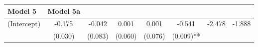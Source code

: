 \documentclass[12pt,twoside]{reedthesis}
\begin{document}
\begin{longtable}[]{@{}lccccccc@{}}
\begin{minipage}[b]{0.10\columnwidth}
  Model 5\strut
  \end{minipage} & \begin{minipage}[b]{0.10\columnwidth}\centering\strut
  Model 5a\strut
  \end{minipage}\tabularnewline
  \midrule
  \endhead
  \begin{minipage}[t]{0.11\columnwidth}\raggedright\strut
  (Intercept)\strut
  \end{minipage} & \begin{minipage}[t]{0.08\columnwidth}\centering\strut
  -0.175\strut
  \end{minipage} & \begin{minipage}[t]{0.10\columnwidth}\centering\strut
  -0.042\strut
  \end{minipage} & \begin{minipage}[t]{0.10\columnwidth}\centering\strut
  0.001\strut
  \end{minipage} & \begin{minipage}[t]{0.10\columnwidth}\centering\strut
  0.001\strut
  \end{minipage} & \begin{minipage}[t]{0.10\columnwidth}\centering\strut
  -0.541\strut
  \end{minipage} & \begin{minipage}[t]{0.10\columnwidth}\centering\strut
  -2.478\strut
  \end{minipage} & \begin{minipage}[t]{0.10\columnwidth}\centering\strut
  -1.888\strut
  \end{minipage}\tabularnewline
  \begin{minipage}[t]{0.11\columnwidth}\raggedright\strut
  \strut
  \end{minipage} & \begin{minipage}[t]{0.08\columnwidth}\centering\strut
  (0.030)\strut
  \end{minipage} & \begin{minipage}[t]{0.10\columnwidth}\centering\strut
  (0.083)\strut
  \end{minipage} & \begin{minipage}[t]{0.10\columnwidth}\centering\strut
  (0.060)\strut
  \end{minipage} & \begin{minipage}[t]{0.10\columnwidth}\centering\strut
  (0.076)\strut
  \end{minipage} & \begin{minipage}[t]{0.10\columnwidth}\centering\strut
  (0.009)**\strut
  \end{minipage} & \begin{minipage}[t]{0.10\columnwidth}\centering\strut

\end{minipage}
\end{longtable}
\end{document}
